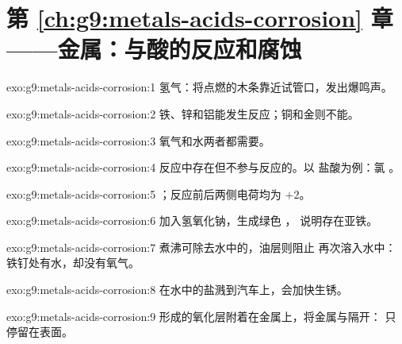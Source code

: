 \section*{第 \ref{ch:g9:metals-acids-corrosion} 章——金属：与酸的反应和腐蚀}

\begin{solution}{exo:g9:metals-acids-corrosion:1}
氢气：将点燃的木条靠近试管口，发出爆鸣声。
\end{solution}

\begin{solution}{exo:g9:metals-acids-corrosion:2}
铁、锌和铝能发生反应；铜和金则不能。
\end{solution}

\begin{solution}{exo:g9:metals-acids-corrosion:3}
氧气和水两者都需要。
\end{solution}

\begin{solution}{exo:g9:metals-acids-corrosion:4}
反应中存在但不参与反应的。以
盐酸为例：氯 。
\end{solution}

\begin{solution}{exo:g9:metals-acids-corrosion:5}
；反应前后两侧电荷均为 $+2$。
\end{solution}

\begin{solution}{exo:g9:metals-acids-corrosion:6}
加入氢氧化钠，生成绿色 ，
说明存在亚铁。
\end{solution}

\begin{solution}{exo:g9:metals-acids-corrosion:7}
煮沸可除去水中的，油层则阻止
再次溶入水中：铁钉处有水，却没有氧气。
\end{solution}

\begin{solution}{exo:g9:metals-acids-corrosion:8}
在水中的盐溅到汽车上，会加快生锈。
\end{solution}

\begin{solution}{exo:g9:metals-acids-corrosion:9}
形成的氧化层附着在金属上，将金属与隔开：
只停留在表面。
\end{solution}

